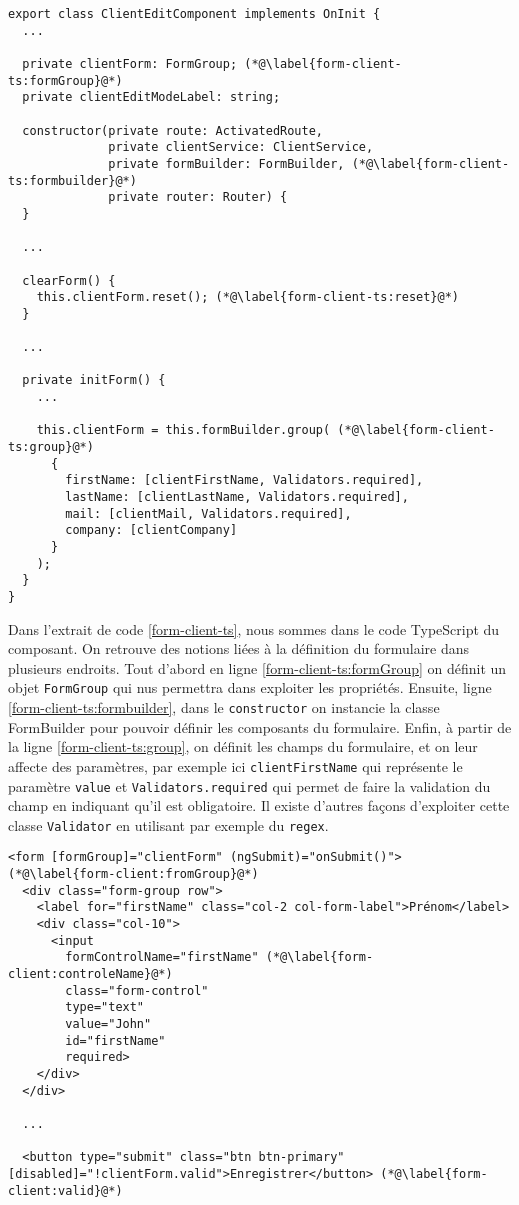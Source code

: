 \begin{lstlisting}[style=htmlcssjs, caption={Formulaire édition Client - TypeScript}, label=form-client-ts]
export class ClientEditComponent implements OnInit {
  ...
  
  private clientForm: FormGroup; (*@\label{form-client-ts:formGroup}@*)
  private clientEditModeLabel: string;

  constructor(private route: ActivatedRoute,
              private clientService: ClientService,
              private formBuilder: FormBuilder, (*@\label{form-client-ts:formbuilder}@*)
              private router: Router) {
  }
  
  ...

  clearForm() {
    this.clientForm.reset(); (*@\label{form-client-ts:reset}@*)
  }

  ...

  private initForm() {
    ...

    this.clientForm = this.formBuilder.group( (*@\label{form-client-ts:group}@*)
      {
        firstName: [clientFirstName, Validators.required],
        lastName: [clientLastName, Validators.required],
        mail: [clientMail, Validators.required],
        company: [clientCompany]
      }
    );
  }
}

\end{lstlisting}

Dans l'extrait de code \ref{form-client-ts}, nous sommes dans le code TypeScript du composant. On retrouve des notions liées à la définition du formulaire dans plusieurs endroits. Tout d'abord en ligne \ref{form-client-ts:formGroup} on définit un objet \texttt{FormGroup} qui nus permettra dans exploiter les propriétés. Ensuite, ligne \ref{form-client-ts:formbuilder}, dans le \texttt{constructor} on instancie la classe FormBuilder pour pouvoir définir les composants du formulaire. Enfin, à partir de la ligne \ref{form-client-ts:group}, on définit les champs du formulaire, et on leur affecte des paramètres, par exemple ici \texttt{clientFirstName} qui représente le paramètre \texttt{value} et \texttt{Validators.required} qui permet de faire la validation du champ en indiquant qu'il est obligatoire. Il existe d'autres façons d'exploiter cette classe \texttt{Validator} en utilisant par exemple du \texttt{regex}.

\begin{lstlisting}[style=htmlcssjs, caption={Formulaire édition Client - Template}, label=form-client]
<form [formGroup]="clientForm" (ngSubmit)="onSubmit()"> (*@\label{form-client:fromGroup}@*)
  <div class="form-group row">
    <label for="firstName" class="col-2 col-form-label">Prénom</label>
    <div class="col-10">
      <input
        formControlName="firstName" (*@\label{form-client:controleName}@*)
        class="form-control"
        type="text"
        value="John"
        id="firstName"
        required>
    </div>
  </div>
  
  ...
  
  <button type="submit" class="btn btn-primary" [disabled]="!clientForm.valid">Enregistrer</button> (*@\label{form-client:valid}@*)
  
\end{lstlisting}

